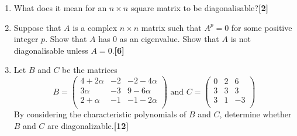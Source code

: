 \documentclass[a4paper]{article}
\begin{document}
\newpage
\begin{qns}\leavevmode
\begin{enumerate}[label=(\alph*)]
\item What does it mean for an $n\times n$ square matrix to be diagonalisable?\hfill\textbf{[2]}
\item Suppose that $A$ is a complex $n\times n$ matrix such that $A^p = 0$ for some positive integer $p$. Show that $A$ has 0 as an eigenvalue. Show that $A$ is not diagonalisable unless $A = 0$.\hfill\textbf{[6]}
\item Let $B$ and $C$ be the matrices
$$B=\begin{pmatrix}4+2\alpha&-2&-2-4\alpha\\3\alpha&-3&9-6\alpha\\2+\alpha&-1&-1-2\alpha\\\end{pmatrix}\text{ and }C=\begin{pmatrix}0&2&6\\3&3&3\\3&1&-3\\\end{pmatrix}$$
By considering the characteristic polynomials of $B$ and $C$, determine whether $B$ and $C$ are diagonalizable.\hfill\textbf{[12]}
\end{enumerate}
\end{qns}
\end{document}
